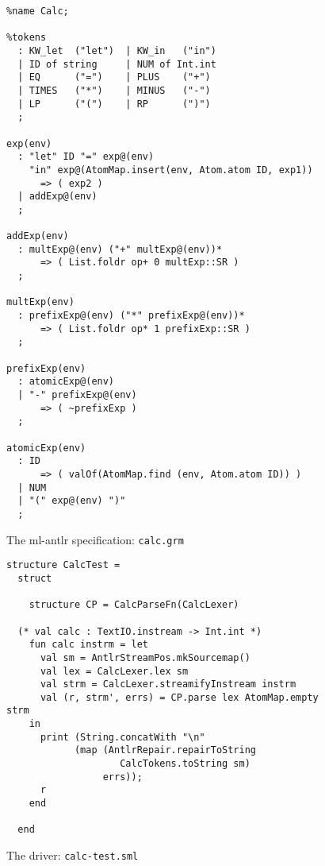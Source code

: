 \begin{figure}[p]
\begin{verbatim}
%name Calc;

%tokens
  : KW_let  ("let")  | KW_in   ("in")
  | ID of string     | NUM of Int.int
  | EQ      ("=")    | PLUS    ("+")
  | TIMES   ("*")    | MINUS   ("-")
  | LP      ("(")    | RP      (")")
  ;
  
exp(env)
  : "let" ID "=" exp@(env) 
    "in" exp@(AtomMap.insert(env, Atom.atom ID, exp1))
      => ( exp2 )
  | addExp@(env)
  ;
  
addExp(env)
  : multExp@(env) ("+" multExp@(env))*
      => ( List.foldr op+ 0 multExp::SR )
  ;
  
multExp(env)
  : prefixExp@(env) ("*" prefixExp@(env))*
      => ( List.foldr op* 1 prefixExp::SR )
  ;
  
prefixExp(env)
  : atomicExp@(env)
  | "-" prefixExp@(env)
      => ( ~prefixExp )
  ;
  
atomicExp(env)
  : ID  
      => ( valOf(AtomMap.find (env, Atom.atom ID)) )
  | NUM
  | "(" exp@(env) ")"
  ;
\end{verbatim}
\caption{The ml-antlr specification: {\tt calc.grm}}
\label{fig:calc-grm}
\end{figure}

\begin{figure}
\begin{verbatim}
structure CalcTest =
  struct

    structure CP = CalcParseFn(CalcLexer)

  (* val calc : TextIO.instream -> Int.int *)
    fun calc instrm = let
      val sm = AntlrStreamPos.mkSourcemap()
      val lex = CalcLexer.lex sm
      val strm = CalcLexer.streamifyInstream instrm
      val (r, strm', errs) = CP.parse lex AtomMap.empty strm
    in
      print (String.concatWith "\n" 
            (map (AntlrRepair.repairToString 
                    CalcTokens.toString sm) 
                 errs));
      r
    end

  end
\end{verbatim}
\caption{The driver: {\tt calc-test.sml}}
\label{fig:calc-test}
\end{figure}